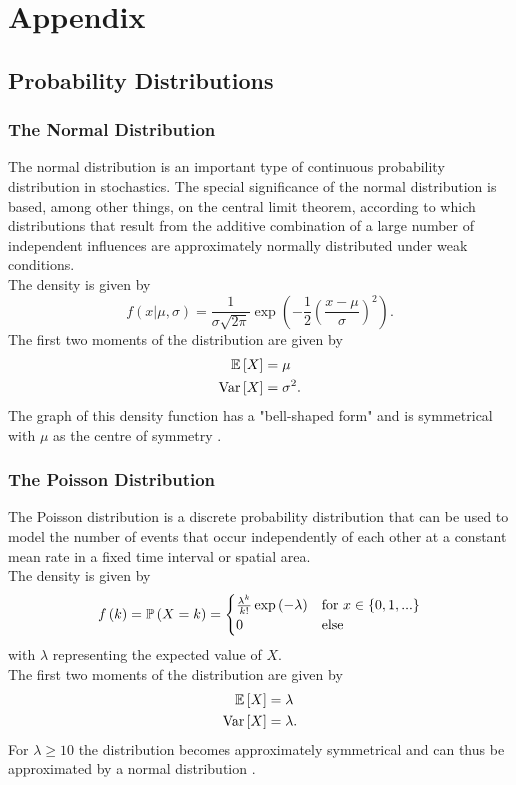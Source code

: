 %
\chapter{Appendix}
\label{sec:appendix}
\section{Probability Distributions}
\subsection{The Normal Distribution}
The normal distribution is an important type of continuous probability distribution in stochastics. The special significance of the normal distribution is based, among other things, on the central limit theorem, according to which distributions that result from the additive combination of a large number of independent influences are approximately normally distributed under weak conditions. \\
The density is given by
\begin{equation}
    f\left(x|\mu,\sigma\right)=\frac{1}{\sigma\sqrt{2\pi}}\exp\left(-\frac{1}{2}\left(\frac{x-\mu}{\sigma}\right)^2\right).
\end{equation}
The first two moments of the distribution are given by
\begin{align}
    \mathbb{E}\left[X\right] &= \mu \\
    \hbox{Var}\left[X\right] &= \sigma^2.
\end{align}
The graph of this density function has a "bell-shaped form" and is symmetrical with $\mu$ as the centre of symmetry \autocite[][83-85]{fahrmeir2016statistik}.
\subsection{The Poisson Distribution}
The Poisson distribution is a discrete probability distribution that can be used to model the number of events that occur independently of each other at a constant mean rate in a fixed time interval or spatial area. \\
The density is given by
\begin{equation}
    f\left(k\right)=\mathbb{P}\left(X=k\right)=\begin{cases}
    \frac{\lambda^k}{k!}\exp\left(-\lambda\right) & \hbox{for }x\in\left\lbrace0,1,...\right\rbrace \\
    0 & \hbox{else}
    \end{cases}
\end{equation}
with $\lambda$ representing the expected value of $X$.  \\
The first two moments of the distribution are given by
\begin{align}
    \mathbb{E}\left[X\right] &= \lambda \\
    \hbox{Var}\left[X\right] &= \lambda.
\end{align}
For $\lambda\geq10$ the distribution becomes approximately symmetrical and can thus be approximated by a normal distribution \autocite[][243]{fahrmeir2016statistik}.
